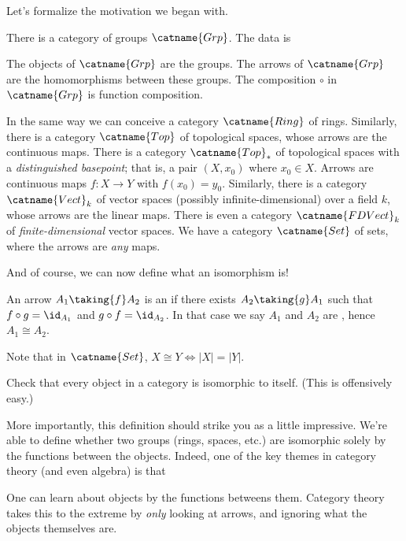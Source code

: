 \documentclass[11pt]{scrreprt}
\begin{document}
Let's formalize the motivation we began with.
\begin{example}
	\listhack
	\label{example:basic_categories}
	\begin{enumerate}[(a)]
		\ii There is a category of groups $\catname{Grp}$. The data is
		\begin{itemize}
			\ii The objects of $\catname{Grp}$ are the groups.
			\ii The arrows of $\catname{Grp}$ are the homomorphisms between these groups.
			\ii The composition $\circ$ in $\catname{Grp}$ is function composition.
		\end{itemize}
		\ii In the same way we can conceive a category $\catname{Ring}$ of rings.
		\ii Similarly, there is a category $\catname{Top}$ of topological spaces,
		whose arrows are the continuous maps.
		\ii There is a category $\catname{Top}_\ast$ of topological spaces with a \emph{distinguished basepoint};
		that is, a pair $(X, x_0)$ where $x_0 \in X$.
		Arrows are continuous maps $f : X \to Y$ with $f(x_0) = y_0$.
		\ii Similarly, there is a category $\catname{Vect}_k$ of
		vector spaces (possibly infinite-dimensional) over a field $k$,
		whose arrows are the linear maps.
		There is even a category $\catname{FDVect}_k$ of
		\emph{finite-dimensional} vector spaces.
		\ii We have a category $\catname{Set}$ of sets,
		where the arrows are \emph{any} maps.
	\end{enumerate}
\end{example}
And of course, we can now define what an isomorphism is!
\begin{definition}
	An arrow $A_1 \taking{f} A_2$ is an 
	if there exists $A_2 \taking{g} A_1$ such that $f \circ g = \id_{A_1}$
	and $g \circ f = \id_{A_2}$.
	In that case we say $A_1$ and $A_2$ are , hence $A_1 \cong A_2$.
\end{definition}
\begin{remark}
	Note that in $\catname{Set}$, $X \cong Y
	\iff \left\lvert X \right\rvert = \left\lvert Y \right\rvert$.
\end{remark}
\begin{ques}
	Check that every object in a category is isomorphic to itself.
	(This is offensively easy.)
\end{ques}
More importantly, this definition should strike you as a little impressive.
We're able to define whether two groups (rings, spaces, etc.) are isomorphic
solely by the functions between the objects.
Indeed, one of the key themes in category theory (and even algebra) is that
\begin{moral}
	One can learn about objects by the functions betweens them.
	Category theory takes this to the extreme by \emph{only} looking at arrows,
	and ignoring what the objects themselves are.
\end{moral}
\end{document}
